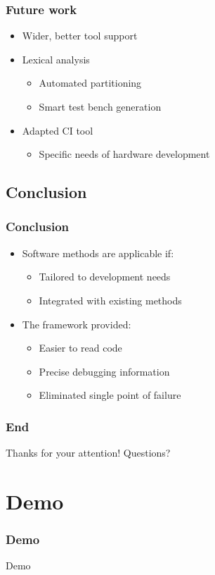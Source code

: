 \documentclass[british,10pt]{beamer}
\begin{document}
\begin{frame}\frametitle{Future work}
\begin{itemize}
\item Wider, better tool support
\item Lexical analysis
\begin{itemize}
\item Automated partitioning
\item Smart test bench generation
\end{itemize}
\item Adapted CI tool
\begin{itemize}
\item Specific needs of hardware development
\end{itemize}
\end{itemize}
\end{frame}

\subsection{Conclusion}

\begin{frame}\frametitle{Conclusion}
\begin{itemize}
\item Software methods are applicable if:
\begin{itemize}
\item Tailored to development needs
\item Integrated with existing methods
\end{itemize}
\vskip3pt
\item The framework provided:
\begin{itemize}
\item Easier to read code
\item Precise debugging information
\item Eliminated single point of failure
\end{itemize}
\end{itemize}
\end{frame}


\begin{frame}\frametitle{End}
\centering
\Large
Thanks for your attention!
\vskip20pt
Questions?
\end{frame}

\section{Demo}
\begin{frame}\frametitle{Demo}
\centering
\Huge Demo
\end{frame}
\end{document}
